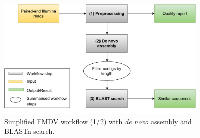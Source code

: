 \begin{figure}[ht!]
	\centering
	\includegraphics[width=0.9\textwidth]{media/3-fmdv-1-2.pdf}
	\caption{Simplified FMDV workflow (1/2) with \textit{de novo} assembly and BLASTn search.}
	\label{fig:3-fmdv-wf-1}
\end{figure}

